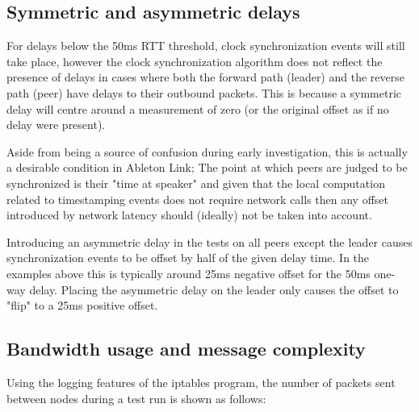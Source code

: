 \documentclass[11pt]{article} %
\theoremstyle{plain}
\theoremstyle{definition}
\begin{document}
\subsection{Symmetric and asymmetric delays}

For delays below the 50ms RTT threshold, clock synchronization events will
still take place, however the clock synchronization algorithm does not reflect
the presence of delays in cases where both the forward path (leader) and
the reverse path (peer) have delays to their outbound packets. This is because
a symmetric delay will centre around a measurement of zero (or the original
offset as if no delay were present).


Aside from being a source of confusion during early investigation, this is
actually a desirable condition in Ableton Link; The point at which peers are
judged to be synchronized is their "time at speaker" and given that the local
computation related to timestamping events does not require network calls then
any offset introduced by network latency should (ideally) not be taken into
account.

Introducing an asymmetric delay in the tests on all peers except the leader
causes synchronization events to be offset by half of the given delay time. In
the examples above this is typically around 25ms negative offset for the 50ms
one-way delay. Placing the asymmetric delay on the leader only causes the
offset to "flip" to a 25ms positive offset.

\subsection{Bandwidth usage and message complexity}

Using the logging features of the iptables program, the number of packets
sent between nodes during a test run is shown as follows:

\end{document}
